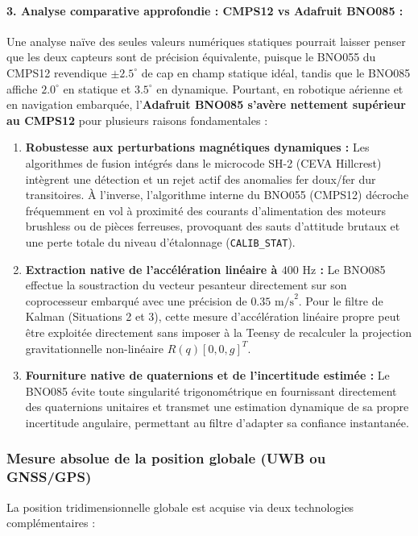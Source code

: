 \documentclass[../Formulations_Kalman.tex]{subfiles}
\begin{document}
\paragraph{3. Analyse comparative approfondie : CMPS12 vs Adafruit BNO085 :}
Une analyse naïve des seules valeurs numériques statiques pourrait laisser penser que les deux capteurs sont de précision équivalente, puisque le BNO055 du CMPS12 revendique $\pm 2.5^\circ$ de cap en champ statique idéal, tandis que le BNO085 affiche $2.0^\circ$ en statique et $3.5^\circ$ en dynamique. Pourtant, en robotique aérienne et en navigation embarquée, l'\textbf{Adafruit BNO085 s'avère nettement supérieur au CMPS12} pour plusieurs raisons fondamentales :
\begin{enumerate}
    \item \textbf{Robustesse aux perturbations magnétiques dynamiques :} Les algorithmes de fusion intégrés dans le microcode SH-2 (CEVA Hillcrest) intègrent une détection et un rejet actif des anomalies fer doux/fer dur transitoires. À l'inverse, l'algorithme interne du BNO055 (CMPS12) décroche fréquemment en vol à proximité des courants d'alimentation des moteurs brushless ou de pièces ferreuses, provoquant des sauts d'attitude brutaux et une perte totale du niveau d'étalonnage (\texttt{CALIB\_STAT}).
    \item \textbf{Extraction native de l'accélération linéaire à $400\text{ Hz}$ :} Le BNO085 effectue la soustraction du vecteur pesanteur directement sur son coprocesseur embarqué avec une précision de $0.35\text{ m/s}^2$. Pour le filtre de Kalman (Situations 2 et 3), cette mesure d'accélération linéaire propre peut être exploitée directement sans imposer à la Teensy de recalculer la projection gravitationnelle non-linéaire $R(q) [0, 0, g]^T$.
    \item \textbf{Fourniture native de quaternions et de l'incertitude estimée :} Le BNO085 évite toute singularité trigonométrique en fournissant directement des quaternions unitaires et transmet une estimation dynamique de sa propre incertitude angulaire, permettant au filtre d'adapter sa confiance instantanée.
\end{enumerate}

\subsubsection{Mesure absolue de la position globale (UWB ou GNSS/GPS)}
La position tridimensionnelle globale est acquise via deux technologies complémentaires :
\end{document}
